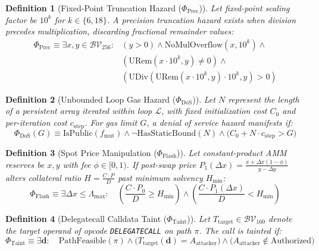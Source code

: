 \documentclass[pdflatex,sn-mathphys]{sn-jnl}
\theoremstyle{thmstyleone}
\newtheorem{definition}{Definition}
\theoremstyle{thmstyletwo}
\begin{document}
\begin{definition}[Fixed-Point Truncation Hazard ($\Phi_{\mathrm{Prec}}$)]\label{def:prec}
Let fixed-point scaling factor be $10^k$ for $k \in \{6, 18\}$. A precision truncation hazard exists when division precedes multiplication, discarding fractional remainder values:
\begin{equation}
\begin{aligned}
    \Phi_{\mathrm{Prec}} \equiv \exists x, y \in \mathcal{BV}_{256} : {} & (y > 0) \land \mathrm{NoMulOverflow}(x, 10^k) \land {} \\
    & (\mathrm{URem}(x \cdot 10^k, y) \neq 0) \land {} \\
    & \left( \mathrm{UDiv}(\mathrm{URem}(x \cdot 10^k, y) \cdot 10^k, y) > 0 \right)
\end{aligned}
\end{equation}
\end{definition}

\begin{definition}[Unbounded Loop Gas Hazard ($\Phi_{\mathrm{DoS}}$)]\label{def:dos}
Let $N$ represent the length of a persistent array iterated within loop $\mathcal{L}$, with fixed initialization cost $C_0$ and per-iteration cost $c_{\mathrm{step}}$. For gas limit $G$, a denial of service hazard manifests if:
\begin{equation}
    \Phi_{\mathrm{DoS}}(G) \equiv \mathrm{IsPublic}(f_{\mathrm{mut}}) \land \neg \mathrm{HasStaticBound}(N) \land \big( C_0 + N \cdot c_{\mathrm{step}} > G \big)
\end{equation}
\end{definition}

\begin{definition}[Spot Price Manipulation ($\Phi_{\mathrm{Flash}}$)]\label{def:flash}
Let constant-product AMM reserves be $x, y$ with fee $\phi \in [0, 1)$. If post-swap price $P_1(\Delta x) = \frac{x + \Delta x(1-\phi)}{y - \Delta y}$ alters collateral ratio $H = \frac{C \cdot P}{D}$ past minimum solvency $H_{\mathrm{min}}$:
\begin{equation}
    \Phi_{\mathrm{Flash}} \equiv \exists \Delta x \le \Lambda_{\mathrm{max}} : \quad \left( \frac{C \cdot P_0}{D} \ge H_{\mathrm{min}} \right) \land \left( \frac{C \cdot P_1(\Delta x)}{D} < H_{\mathrm{min}} \right)
\end{equation}
\end{definition}

\begin{definition}[Delegatecall Calldata Taint ($\Phi_{\mathrm{Taint}}$)]\label{def:taint}
Let $T_{\mathrm{target}} \in \mathcal{BV}_{160}$ denote the target operand of opcode \texttt{DELEGATECALL} on path $\pi$. The call is tainted if:
\begin{equation}
    \Phi_{\mathrm{Taint}} \equiv \exists \mathbf{d} : \quad \mathrm{PathFeasible}(\pi) \land \big(T_{\mathrm{target}}(\mathbf{d}) = A_{\mathrm{attacker}}\big) \land \big(A_{\mathrm{attacker}} \notin \mathrm{Authorized}\big)
\end{equation}
\end{definition}
\end{document}
